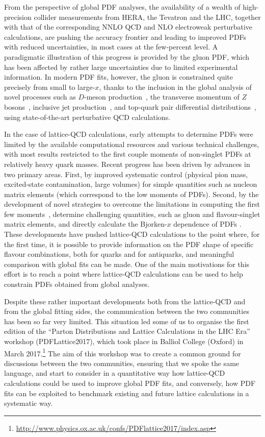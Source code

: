 From the perspective of
global PDF analyses, the availability of a wealth of high-precision collider measurements
from HERA, the Tevatron and the LHC, together with that of the corresponding
NNLO QCD and NLO electroweak perturbative calculations, are pushing the
accuracy frontier and leading to improved PDFs with reduced uncertainties,
in most cases at the few-percent level.
%
A paradigmatic illustration of this progress is provided by the gluon PDF, which has been
affected by rather large uncertainties due to limited experimental
information.
%
In modern PDF fits, however, the gluon is
constrained quite precisely from small to large-$x$,
thanks to the inclusion in the
global analysis of novel processes such as $D$-meson
production~\cite{Zenaiev:2015rfa,Gauld:2016kpd},
the transverse momentum of $Z$ bosons~\cite{Boughezal:2017nla},
inclusive jet production~\cite{Currie:2016bfm},
and top-quark pair differential
distributions~\cite{Czakon:2016olj,Guzzi:2014wia}, using state-of-the-art
perturbative QCD calculations.

In the case of lattice-QCD calculations, early attempts to determine PDFs were limited by the 
available computational resources and various technical challenges, with most results restricted to
the first couple moments of non-singlet PDFs at relatively heavy quark masses.
%
Recent progress has been driven by advances in two primary areas. 
First, by improved systematic control (physical pion mass, excited-state contamination, large volumes) 
for simple quantities such as nucleon matrix elements (which correspond to the low moments of PDFs).
Second, by the  development of novel strategies to overcome the limitations in computing the first few 
moments~\cite{Constantinou:2014tga,Syritsyn:2014saa,Lin:2012ev}, determine challenging quantities, 
such as gluon and flavour-singlet matrix elements, and directly calculate the Bjorken-$x$ dependence of PDFs \cite{Lin:2014zya,Alexandrou:2015rja,Chen:2016utp,Alexandrou:2016jqi}.
%
These developments have pushed lattice-QCD calculations
to the point where, for the first time, it is possible to provide information on the PDF shape
of specific flavour combinations, both for quarks and for antiquarks, and meaningful comparison with 
global fits can be made.
%
One of the main motivations for this effort is to reach a point where lattice-QCD
calculations can be used to help constrain 
PDFs obtained from global analyses.

Despite these rather important developments both from the lattice-QCD
and from the global fitting sides,
the communication between the
two communities has been so far very limited.
%
This situation led some of us
to organise the first edition of the
``Parton Distributions and Lattice Calculations in the LHC Era''
workshop (PDFLattice2017), which took
place in Balliol College (Oxford) in March
2017.\footnote{\url{http://www.physics.ox.ac.uk/confs/PDFlattice2017/index.asp}}
%
The aim of this workshop was to create a common ground for discussions
between the two communities, ensuring that we spoke the same language,
and start to consider in a quantitative way how lattice-QCD calculations could be used
to improve global PDF fits, and conversely, how PDF fits can be exploited to benchmark
existing and future lattice calculations in a systematic way.

